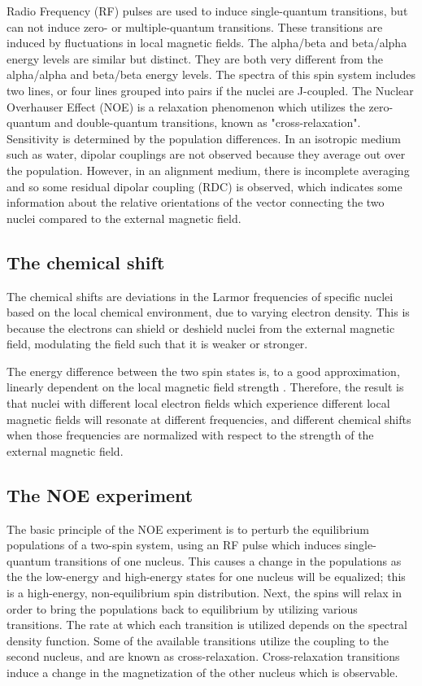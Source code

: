Radio Frequency (RF) pulses are used to induce single-quantum transitions, 
but can not induce zero- or multiple-quantum transitions.  These transitions 
are induced by fluctuations in local magnetic fields.
The alpha/beta and beta/alpha energy levels are similar but distinct.  They are both
very different from the alpha/alpha and beta/beta energy levels.  The spectra of this
spin system includes two lines, or four lines grouped into pairs if the 
nuclei are J-coupled.
The Nuclear Overhauser Effect (NOE) is a relaxation phenomenon which utilizes 
the zero-quantum and double-quantum transitions, known as "cross-relaxation".
Sensitivity is determined by the population differences.
In an isotropic medium such as water, dipolar couplings are not observed
because they average out over the population.
However, in an alignment medium, there is incomplete averaging
and so some residual dipolar coupling (RDC) is observed, which indicates 
some information about the relative orientations of the vector connecting
the two nuclei compared to the external magnetic field.


\subsection*{The chemical shift}

The chemical shifts are deviations in the Larmor frequencies of specific 
nuclei based on the local chemical environment, due to varying
electron density.  This is because the electrons can shield or deshield nuclei
from the external magnetic field, modulating the field such that it is weaker
or stronger.

The energy difference between the two spin states is, to a good approximation,
linearly dependent on the local magnetic field strength 
\cite{cavanagh1995protein}.  Therefore, the 
result is that nuclei with different local electron fields which experience
different local magnetic fields will resonate at different frequencies, and
different chemical shifts when those frequencies are normalized with respect
to the strength of the external magnetic field.


\subsection*{The NOE experiment}

The basic principle of the NOE experiment is to perturb the equilibrium 
populations of a two-spin system, using an RF pulse which induces single-quantum
transitions of one nucleus.  This causes a change in the populations as the
the low-energy and high-energy states for one nucleus will be equalized; this
is a high-energy, non-equilibrium spin distribution.  Next, the spins will relax
in order to bring the populations back to equilibrium by utilizing various 
transitions.  The rate at which each transition is utilized depends on the
spectral density function.  Some of the available transitions utilize the 
coupling to the second nucleus, and are known as cross-relaxation.  
Cross-relaxation transitions induce a change in the magnetization of the other
nucleus which is observable.

